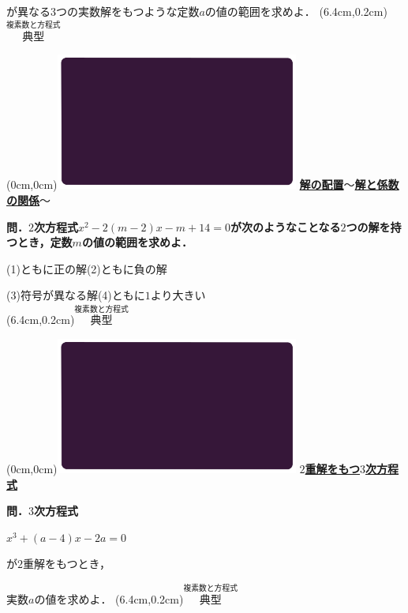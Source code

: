 \documentclass[10pt,
fleqn,
dvipdfmx,
uplatex
]{jsarticle}
\begin{document}
\Large 
が異なる$3$つの実数解をもつような定数$a$の値の範囲を求めよ．
\at(6.4cm,0.2cm){\small\color{bradorange}$\overset{\text{複素数と方程式}}{\text{典型}}$}


\newpage



\at(0cm,0cm){\includegraphics[width=8cm,bb=0 0 1920 1080]{./media_local/smart_background/複素数と方程式.jpeg}}
{\color{orange}\bf\boldmath\Large\underline{解の配置$〜$解と係数の関係$〜$}}\vspace{0.3zw}

\normalsize 
\bf\boldmath 問．$2$次方程式$x^2-2\left(m-2\right)x-m+{14}=0$が次のようなことなる$2$つの解を持つとき，定数$m$の値の範囲を求めよ．

\Large
(1)ともに正の解\hspace{0.2zw}(2)ともに負の解\vspace{0.2zw}

\normalsize
\hspace{0.2zw}(3)符号が異なる解\hspace{1.5zw}(4)ともに$1$より大きい\\

\at(6.4cm,0.2cm){\small\color{bradorange}$\overset{\text{複素数と方程式}}{\text{典型}}$}


\newpage



\at(0cm,0cm){\includegraphics[width=8cm,bb=0 0 1920 1080]{./media_local/smart_background/複素数と方程式.jpeg}}
{\color{orange}\bf\boldmath\Large\underline{$2$重解をもつ$3$次方程式}}\vspace{0.1zw}

\LARGE 
\bf\boldmath 問．$3$次方程式

\hspace{0.2zw}$x^3+\left(a-4\right)x-2a=0$

が$2$重解をもつとき，

\vspace{-0.2zw}
\hfill 実数$a$の値を求めよ．
\at(6.4cm,0.2cm){\small\color{bradorange}$\overset{\text{複素数と方程式}}{\text{典型}}$}
\end{document}
